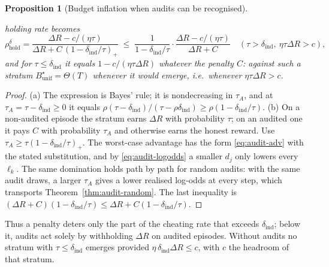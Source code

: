 \documentclass[11pt,a4paper]{article}
\newtheorem{proposition}[theorem]{Proposition}
\begin{document}
\begin{proposition}[Budget inflation when audits can be recognised]
\begin{enumerate}
holding rate becomes
\[
  \rho^{\delta}_{\mathrm{hold}}=\frac{\Delta R-c/(\eta\tau)}{\Delta R+C\,(1-\delta_{\mathrm{ind}}/\tau)_+}
  \;\le\;\frac{1}{1-\delta_{\mathrm{ind}}/\tau}\cdot\frac{\Delta R-c/(\eta\tau)}{\Delta R+C}
  \quad(\tau>\delta_{\mathrm{ind}},\ \eta\tau\Delta R>c),
\]
and for $\tau\le\delta_{\mathrm{ind}}$ it equals $1-c/(\eta\tau\Delta R)$
whatever the penalty $C$: against such a stratum $B^\star_{\mathrm{unif}}=\Theta(T)$
whenever it would emerge, i.e.\ whenever $\eta\tau\Delta R>c$.
\end{enumerate}
\end{proposition}
\begin{proof}
(a) The expression is Bayes' rule; it is nondecreasing in $\tau_A$, and at
$\tau_A=\tau-\delta_{\mathrm{ind}}\ge0$ it equals
$\rho(\tau-\delta_{\mathrm{ind}})/(\tau-\rho\delta_{\mathrm{ind}})\ge\rho(1-\delta_{\mathrm{ind}}/\tau)$.
(b) On a non-audited episode the stratum earns $\Delta R$ with probability
$\tau$; on an audited one it pays $C$ with probability $\tau_A$ and otherwise
earns the honest reward. Use $\tau_A\ge\tau(1-\delta_{\mathrm{ind}}/\tau)_+$.
The worst-case advantage has the form \eqref{eq:audit-adv} with the stated
substitution, and by \eqref{eq:audit-logodds} a smaller $d_j$ only lowers every
$\ell_k$. The same domination holds path by path for random audits: with the same audit draws, a larger $\tau_A$ gives a lower realised log-odds at every step, which transports Theorem~\ref{thm:audit-random}. The last inequality is
$(\Delta R+C)(1-\delta_{\mathrm{ind}}/\tau)\le\Delta R+C(1-\delta_{\mathrm{ind}}/\tau)$.
\end{proof}
\noindent
Thus a penalty deters only the part of the cheating rate that exceeds
$\delta_{\mathrm{ind}}$; below it, audits act solely by withholding $\Delta R$
on audited episodes. Without audits no stratum with
$\tau\le\delta_{\mathrm{ind}}$ emerges provided
$\eta\,\delta_{\mathrm{ind}}\Delta R\le c$, with $c$ the headroom of that
stratum.
\end{document}
